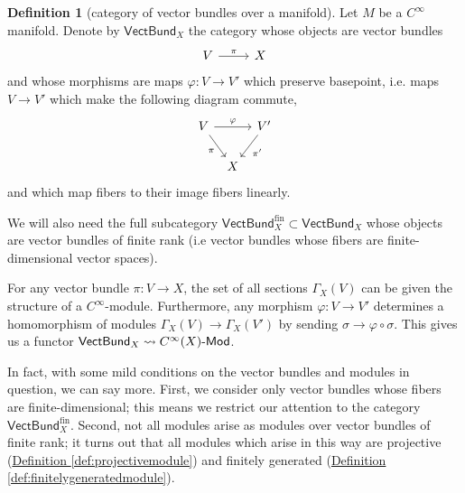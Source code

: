 \documentclass[a4paper]{report}
\def\mhyp{{\hbox{-}}}
\theoremstyle{definition}
\newtheorem{definition}{Definition}[section]
\theoremstyle{plain}
\theoremstyle{remark}
\begin{document}
\begin{definition}[category of vector bundles over a manifold]
  \label{def:categoryofvectorbundlesoveramanifold}
  Let $M$ be a $C^{\infty}$ manifold. Denote by $\mathsf{VectBund}_{X}$ the category whose objects are vector bundles 
  \begin{equation*}
    \begin{tikzcd}
      V 
      \arrow[r, "\pi"]
      & X
    \end{tikzcd}
  \end{equation*}
  and whose morphisms are maps $\varphi\colon V \to V'$ which preserve basepoint, i.e. maps $V \to V'$ which make the following diagram commute,
  \begin{equation*}
    \begin{tikzcd}[column sep=tiny]
      V
      \arrow[rr, "\varphi"]
      \arrow[rd, swap, "\pi"]
      & & V'
      \arrow[ld, "\pi'"]
      \\
      & X
    \end{tikzcd}
  \end{equation*}
  and which map fibers to their image fibers linearly.

  We will also need the full subcategory $\mathsf{VectBund}_{X}^{\text{fin}} \subset \mathsf{VectBund}_{X}$ whose objects are vector bundles of finite rank (i.e vector bundles whose fibers are finite-dimensional vector spaces).
\end{definition}

For any vector bundle $\pi\colon V \to X$, the set of all sections $\Gamma_{X}(V)$ can be given the structure of a $C^{\infty}$-module. Furthermore, any morphism $\varphi\colon V \to V'$ determines a homomorphism of modules $\Gamma_{X}(V) \to \Gamma_{X}(V')$ by sending $\sigma \to \varphi \circ \sigma$. This gives us a functor $\mathsf{VectBund}_{X} \rightsquigarrow C^{\infty}(X)\mhyp\mathsf{Mod}$.

In fact, with some mild conditions on the vector bundles and modules in question, we can say more. First, we consider only vector bundles whose fibers are finite-dimensional; this means we restrict our attention to the category $\mathsf{VectBund}^{\mathrm{fin}}_{X}$. Second, not all modules arise as modules over vector bundles of finite rank; it turns out that all modules which arise in this way are projective (\hyperref[def:projectivemodule]{Definition \ref*{def:projectivemodule}}) and finitely generated (\hyperref[def:finitelygeneratedmodule]{Definition \ref*{def:finitelygeneratedmodule}}).
\end{document}
